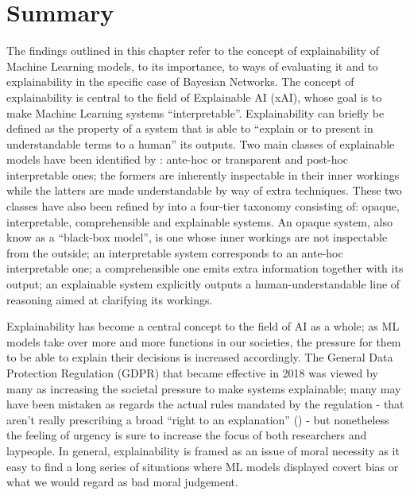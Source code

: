 \documentclass[mscthesis]{usiinfthesis}
\begin{document}



\section{Summary} \label{sec:literature-review-summary}
The findings outlined in this chapter refer to the concept of explainability of Machine Learning models, to its importance, to ways of evaluating it and to explainability in the specific case of Bayesian Networks.
The concept of explainability is central to the field of Explainable AI (xAI), whose goal is to make Machine Learning systems \enquote{interpretable}.
Explainability can briefly be defined as the property of a system that is able to \enquote{explain or to present in understandable terms to a human} its outputs.
Two main classes of explainable models have been identified by \cite{mittelstadt2019explaining}: ante-hoc or transparent and post-hoc interpretable ones; the formers are inherently inspectable in their inner workings while the latters are made understandable by way of extra techniques.
These two classes have also been refined by \cite{doshi2017towards} into a four-tier taxonomy consisting of: opaque, interpretable, comprehensible and explainable systems.
An opaque system, also know as a \enquote{black-box model}, is one whose inner workings are not inspectable from the outside; an interpretable system corresponds to an ante-hoc interpretable one; a comprehensible one emits extra information together with its output; an explainable system explicitly outputs a human-understandable line of reasoning aimed at clarifying its workings.

Explainability has become a central concept to the field of AI as a whole; as ML models take over more and more functions in our societies, the pressure for them to be able to explain their decisions is increased accordingly.
The General Data Protection Regulation (GDPR) that became effective in 2018 was viewed by many as increasing the societal pressure to make systems explainable; many may have been mistaken as regards the actual rules mandated by the regulation - that aren't really prescribing a broad \enquote{right to an explanation} (\cite{edwards2018enslaving}) - but nonetheless the feeling of urgency is sure to increase the focus of both researchers and laypeople.
In general, explainability is framed as an issue of moral necessity as it easy to find a long series of situations where ML models displayed covert bias or what we would regard as bad moral judgement.
\end{document}
